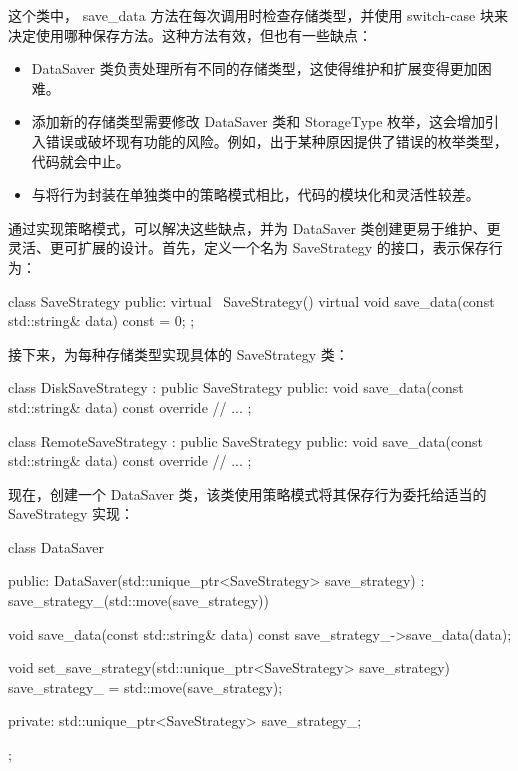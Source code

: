 这个类中， save\_data 方法在每次调用时检查存储类型，并使用 switch-case 块来决定使用哪种保存方法。这种方法有效，但也有一些缺点：

\begin{itemize}
\item
DataSaver 类负责处理所有不同的存储类型，这使得维护和扩展变得更加困难。

\item
添加新的存储类型需要修改 DataSaver 类和 StorageType 枚举，这会增加引入错误或破坏现有功能的风险。例如，出于某种原因提供了错误的枚举类型，代码就会中止。

\item
与将行为封装在单独类中的策略模式相比，代码的模块化和灵活性较差。
\end{itemize}

通过实现策略模式，可以解决这些缺点，并为 DataSaver 类创建更易于维护、更灵活、更可扩展的设计。首先，定义一个名为 SaveStrategy 的接口，表示保存行为：

\begin{cpp}
class SaveStrategy {
public:
    virtual ~SaveStrategy() {}
    virtual void save_data(const std::string& data) const = 0;
};
\end{cpp}

接下来，为每种存储类型实现具体的 SaveStrategy 类：

\begin{cpp}
class DiskSaveStrategy : public SaveStrategy {
    public:
    void save_data(const std::string& data) const override {
        // ...
    }
};

class RemoteSaveStrategy : public SaveStrategy {
    public:
    void save_data(const std::string& data) const override {
        // ...
    }
};
\end{cpp}

现在，创建一个 DataSaver 类，该类使用策略模式将其保存行为委托给适当的 SaveStrategy 实现：

\begin{cpp}
class DataSaver {
public:
    DataSaver(std::unique_ptr<SaveStrategy> save_strategy)
     : save_strategy_(std::move(save_strategy)) {}

    void save_data(const std::string& data) const {
        save_strategy_->save_data(data);
    }

    void set_save_strategy(std::unique_ptr<SaveStrategy> save_strategy) {
        save_strategy_ = std::move(save_strategy);
    }

private:
    std::unique_ptr<SaveStrategy> save_strategy_;
};
\end{cpp}

